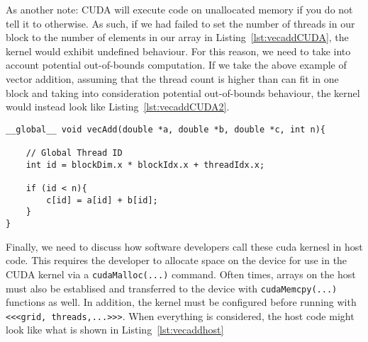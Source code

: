 As another note: CUDA will execute code on unallocated memory if you do not tell it to otherwise.
As such, if we had failed to set the number of threads in our block to the number of elements in our array in Listing~\ref{lst:vecaddCUDA}, the kernel would exhibit undefined behaviour.
For this reason, we need to take into account potential out-of-bounds computation.
If we take the above example of vector addition, assuming that the thread count is higher than can fit in one block and taking into consideration potential out-of-bounds behaviour, the kernel would instead look like Listing~\ref{lst:vecaddCUDA2}.

\begin{lstlisting}[float,label=lst:vecaddCUDA2, style=c++,caption={An example of a vector addition kernel in CUDA using blocks and threads, and ensuring no computation happens beyond the size of the array, $n$.}]
__global__ void vecAdd(double *a, double *b, double *c, int n){

    // Global Thread ID
    int id = blockDim.x * blockIdx.x + threadIdx.x;

    if (id < n){
        c[id] = a[id] + b[id];
    }
}
\end{lstlisting}

Finally, we need to discuss how software developers call these cuda kernesl in host code.
This requires the developer to allocate space on the device for use in the CUDA kernel via a \texttt{cudaMalloc(...)} command.
Often times, arrays on the host must also be establised and transferred to the device with \texttt{cudaMemcpy(...)} functions as well.
In addition, the kernel must be configured before running with \texttt{<<<grid, threads,...>>>}.
When everything is considered, the host code might look like what is shown in Listing~\ref{lst:vecaddhost}


